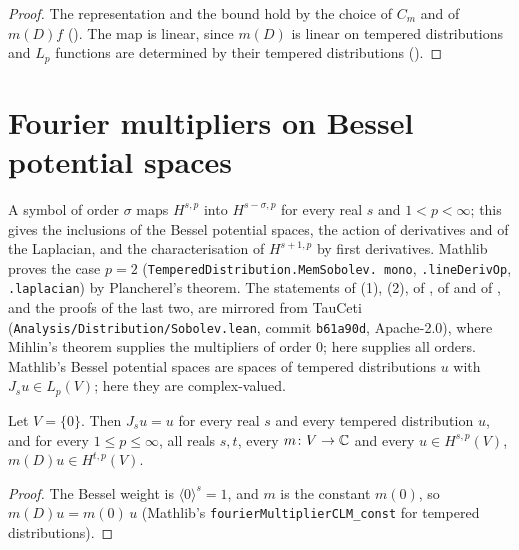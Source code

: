 \begin{proof}
\leanok
The representation and the bound hold by the choice of $C_m$ and of $m(D) f$
(). The map is linear, since $m(D)$ is linear on tempered distributions
and $L_p$ functions are determined by their tempered distributions
().
\end{proof}

\section{Fourier multipliers on Bessel potential spaces}
\label{sec:bessel-potential-multipliers}

A symbol of order $\sigma$ maps $H^{s,p}$ into $H^{s-\sigma,p}$ for every real $s$ and
$1 < p < \infty$; this gives the inclusions of the Bessel potential spaces, the action of
derivatives and of the Laplacian, and the characterisation of $H^{s+1,p}$ by first derivatives.
Mathlib proves the case $p = 2$ (\texttt{TemperedDistribution.\allowbreak MemSobolev.\allowbreak
mono}, \texttt{.lineDerivOp}, \texttt{.laplacian}) by Plancherel's theorem. The statements of
 (1), (2), of , of
 and of
, and the proofs of the last two, are mirrored from TauCeti
(\texttt{Analysis/\allowbreak Distribution/\allowbreak Sobolev.lean}, commit \texttt{b61a90d},
Apache-2.0), where Mihlin's theorem supplies the multipliers of order $0$; here
 supplies all orders. Mathlib's Bessel potential spaces are
spaces of tempered distributions $u$ with $J_s u \in L_p(V)$; here they are complex-valued.

\begin{lemma}[Dimension $0$]
\label{lem:bessel-potential-dimension-zero}
\leanok
Let $V = \{0\}$. Then $J_s u = u$ for every real $s$ and every tempered distribution $u$, and for
every $1 \leq p \leq \infty$, all reals $s, t$, every $m \colon V \to \mathbb{C}$ and every
$u \in H^{s,p}(V)$, $m(D) u \in H^{t,p}(V)$.
\end{lemma}

\begin{proof}
\leanok
The Bessel weight is $\langle 0 \rangle^s = 1$, and $m$ is the constant $m(0)$, so
$m(D) u = m(0) \, u$ (Mathlib's \texttt{fourierMultiplierCLM\_\allowbreak const} for tempered
distributions).
\end{proof}

